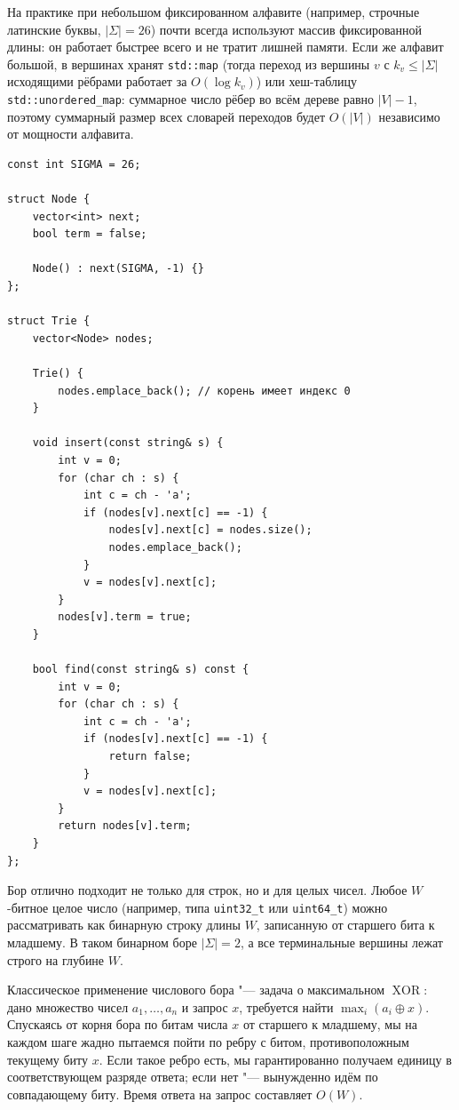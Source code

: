 На практике при небольшом фиксированном алфавите (например, строчные латинские буквы, $|\Sigma| = 26$) почти всегда используют массив фиксированной длины: он работает быстрее всего и не тратит лишней памяти. Если же алфавит большой, в вершинах хранят \texttt{std::map} (тогда переход из вершины $v$ с $k_v \le |\Sigma|$ исходящими рёбрами работает за $O(\log k_v)$) или хеш-таблицу \texttt{std::unordered\_map}: суммарное число рёбер во всём дереве равно $|V| - 1$, поэтому суммарный размер всех словарей переходов будет $O(|V|)$ независимо от мощности алфавита.

\begin{lstlisting}[caption={Реализация бора с массивом переходов фиксированного размера}]
const int SIGMA = 26;

struct Node {
    vector<int> next;
    bool term = false;

    Node() : next(SIGMA, -1) {}
};

struct Trie {
    vector<Node> nodes;

    Trie() {
        nodes.emplace_back(); // корень имеет индекс 0
    }

    void insert(const string& s) {
        int v = 0;
        for (char ch : s) {
            int c = ch - 'a';
            if (nodes[v].next[c] == -1) {
                nodes[v].next[c] = nodes.size();
                nodes.emplace_back();
            }
            v = nodes[v].next[c];
        }
        nodes[v].term = true;
    }

    bool find(const string& s) const {
        int v = 0;
        for (char ch : s) {
            int c = ch - 'a';
            if (nodes[v].next[c] == -1) {
                return false;
            }
            v = nodes[v].next[c];
        }
        return nodes[v].term;
    }
};
\end{lstlisting}

\begin{note}
    Бор отлично подходит не только для строк, но и для целых чисел. Любое $W$-битное целое число (например, типа \texttt{uint32\_t} или \texttt{uint64\_t}) можно рассматривать как бинарную строку длины $W$, записанную от старшего бита к младшему. В таком бинарном боре $|\Sigma| = 2$, а все терминальные вершины лежат строго на глубине $W$.

    Классическое применение числового бора "--- задача о максимальном $\operatorname{XOR}$: дано множество чисел $a_1, \dots, a_n$ и запрос $x$, требуется найти $\max_i (a_i \oplus x)$. Спускаясь от корня бора по битам числа $x$ от старшего к младшему, мы на каждом шаге жадно пытаемся пойти по ребру с битом, противоположным текущему биту $x$. Если такое ребро есть, мы гарантированно получаем единицу в соответствующем разряде ответа; если нет "--- вынужденно идём по совпадающему биту. Время ответа на запрос составляет $O(W)$.
\end{note}


